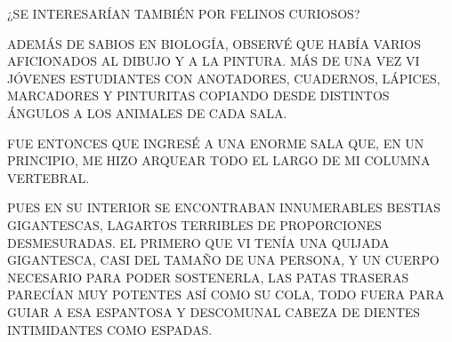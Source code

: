 ¿SE INTERESARÍAN TAMBIÉN POR FELINOS CURIOSOS?

\newpage
{}

\begin{minipage}[r]{.45\textwidth}%
\end{minipage}\hfill
\begin{minipage}[r]{.45\textwidth}%
ADEMÁS DE SABIOS EN BIOLOGÍA, OBSERVÉ QUE HABÍA VARIOS AFICIONADOS AL DIBUJO Y A LA PINTURA. MÁS DE UNA VEZ VI JÓVENES ESTUDIANTES CON ANOTADORES, CUADERNOS, LÁPICES, MARCADORES Y PINTURITAS COPIANDO DESDE DISTINTOS ÁNGULOS A LOS ANIMALES DE CADA SALA.		
\end{minipage}	
\newpage
{}
\begin{center}
\begin{minipage}[r]{.7\textwidth}\hspace{-2cm}
\end{minipage}	
\end{center}
FUE ENTONCES QUE INGRESÉ A UNA ENORME SALA QUE, EN UN PRINCIPIO, ME HIZO ARQUEAR TODO EL LARGO DE MI COLUMNA VERTEBRAL. 

\newpage
{}
PUES EN SU INTERIOR SE ENCONTRABAN INNUMERABLES BESTIAS GIGANTESCAS, LAGARTOS TERRIBLES DE PROPORCIONES DESMESURADAS. EL PRIMERO QUE VI TENÍA UNA QUIJADA GIGANTESCA, CASI DEL TAMAÑO DE UNA PERSONA, Y UN CUERPO NECESARIO PARA PODER SOSTENERLA, LAS PATAS TRASERAS PARECÍAN MUY POTENTES ASÍ COMO SU COLA, TODO FUERA PARA GUIAR A ESA ESPANTOSA Y DESCOMUNAL CABEZA DE DIENTES INTIMIDANTES COMO ESPADAS.

